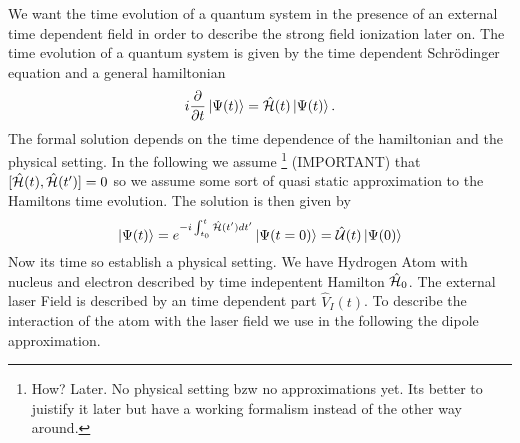 We want the time evolution of a quantum system in the presence of an external time dependent field in order to describe the strong field ionization later on.
The time evolution of a quantum system is given by the time dependent Schrödinger equation and a general hamiltonian
\begin{equation}
    i \frac{\partial}{\partial t} \ket{\Psi(t)} = \hat{\mathcal{H}}(t) \ket{\Psi(t)}. \label{eq:schroedinger}
\end{equation}
The formal solution depends on the time dependence of the hamiltonian and the physical setting. 
In the following we assume \footnote{How? Later. No physical setting bzw no approximations yet. Its better to juistify it later but have a working formalism instead of the other way around.} (IMPORTANT) that $[\hat{\mathcal{H}}(t), \hat{\mathcal{H}}(t')] = 0$ so we assume some sort of quasi static approximation to the Hamiltons time evolution. 
The solution is then given by 
\begin{equation}
    \ket{\Psi(t)} = e^{-i \int_{t_0}^{t} \hat{\mathcal{H}}(t') dt'} \ket{\Psi(t=0)} = \hat{\mathcal{U}}(t)\ket{\Psi(0)}
\end{equation}
Now its time so establish a physical setting. We have Hydrogen Atom with nucleus and electron described by time indepentent Hamilton $\hat{\mathcal{H}}_0$. 
The external laser Field is described by an time dependent part $\hat{V}_I(t)$. To describe the interaction of the atom with the laser field we use in the following the dipole approximation.







\newpage
